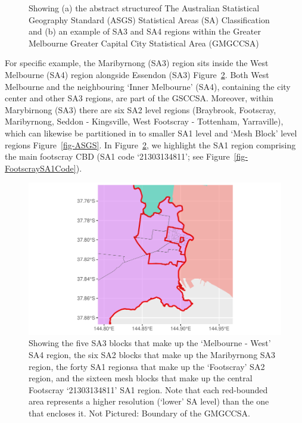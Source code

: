 \documentclass{monashthesis}
\begin{document}
\begin{figure}
\begin{minipage}[t]{0.50\linewidth}
{\begin{figure}
{}

\end{figure}

}

\end{minipage}%

\caption{\label{fig-ASGSSA}Showing (a) the abstract structureof The
Australian Statistical Geography Standard (ASGS) Statistical Areas (SA)
Classification and (b) an example of SA3 and SA4 regions within the
Greater Melbourne Greater Capital City Statistical Area (GMGCCSA)}

\end{figure}

For specific example, the Maribyrnong (SA3) region sits inside the West
Melbourne (SA4) region alongside Essendon (SA3)
Figure~\ref{fig-FootscraySAexample}. Both West Melbourne and the
neighbouring `Inner Melbourne' (SA4), containing the city center and
other SA3 regions, are part of the GSCCSA. Moreover, within Marybirnong
(SA3) there are six SA2 level regions (Braybrook, Footscray,
Maribyrnong, Seddon - Kingsville, West Footscray - Tottenham,
Yarraville), which can likewise be partitioned in to smaller SA1 level
and `Mesh Block' level regions Figure~\ref{fig-ASGS}. In
Figure~\ref{fig-FootscraySAexample}, we highlight the SA1 region
comprising the main footscray CBD (SA1 code `21303134811'; see
Figure~\ref{fig-FootscraySA1Code}).

\begin{figure}

{\centering \includegraphics{03-CurrentStudy_files/figure-pdf/fig-FootscraySAexample-1.pdf}

}

\caption{\label{fig-FootscraySAexample}Showing the five SA3 blocks that
make up the `Melbourne - West' SA4 region, the six SA2 blocks that make
up the Maribyrnong SA3 region, the forty SA1 regionsa that make up the
`Footscray' SA2 region, and the sixteen mesh blocks that make up the
central Footscray `21303134811' SA1 region. Note that each red-bounded
area represents a higher resolution (`lower' SA level) than the one that
encloses it. Not Pictured: Boundary of the GMGCCSA.}

\end{figure}
\end{document}

